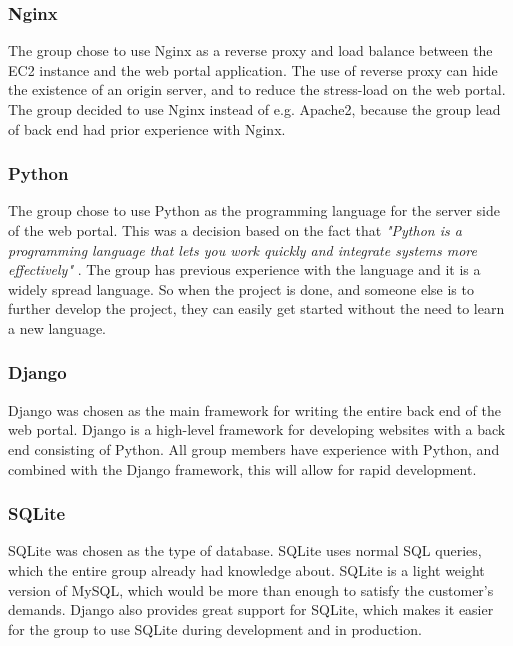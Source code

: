 \subsubsection{Nginx}
The group chose to use Nginx \cite{nginx} as a reverse proxy and load balance between the EC2 instance and the web portal application. The use of reverse proxy can hide the existence of an origin server, and to reduce the stress-load on the web portal. The group decided to use Nginx instead of e.g. Apache2, because the group lead of back end had prior experience with Nginx.


\subsubsection{Python}
The group chose to use Python as the programming language for the server side of the web portal. This was a decision based on the fact that \textit{"Python is a programming language that lets you work quickly and integrate systems more effectively"} \cite{python}. The group has previous experience with the language and it is a widely spread language. So when the project is done, and someone else is to further develop the project, they can easily get started without the need to learn a new language.

\subsubsection{Django}
\label{django}
Django \cite{django} was chosen as the main framework for writing the entire back end of the web portal. Django is a high-level framework for developing websites with a back end consisting of Python. All group members have experience with Python, and combined with the Django framework, this will allow for rapid development.  

\subsubsection{SQLite}
SQLite\cite{SQLite} was chosen as the type of database. SQLite uses normal SQL queries, which the entire group already had knowledge about. SQLite is a light weight version of MySQL, which would be more than enough to satisfy the customer's demands. Django also provides great support for SQLite, which makes it easier for the group to use SQLite during development and in production.


\cleardoublepage
